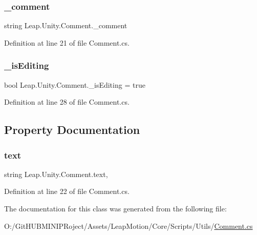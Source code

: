 \subsubsection{\texorpdfstring{\_comment}{\_comment}}
{\footnotesize\ttfamily string Leap.\+Unity.\+Comment.\+\_\+comment\hspace{0.3cm}{\ttfamily [protected]}}



Definition at line 21 of file Comment.\+cs.

\mbox{\label{class_leap_1_1_unity_1_1_comment_a0486c9e426260ebe04619952a89f1451}} 
\subsubsection{\texorpdfstring{\_isEditing}{\_isEditing}}
{\footnotesize\ttfamily bool Leap.\+Unity.\+Comment.\+\_\+is\+Editing = true\hspace{0.3cm}{\ttfamily [protected]}}



Definition at line 28 of file Comment.\+cs.



\subsection{Property Documentation}
\mbox{\label{class_leap_1_1_unity_1_1_comment_a21cc1f0a7d0ee692daae8bf5d4844654}} 
\subsubsection{\texorpdfstring{text}{text}}
{\footnotesize\ttfamily string Leap.\+Unity.\+Comment.\+text\hspace{0.3cm}{\ttfamily [get]}, {\ttfamily [set]}}



Definition at line 22 of file Comment.\+cs.



The documentation for this class was generated from the following file\+:\begin{DoxyCompactItemize}
\item 
O\+:/\+Git\+H\+U\+B\+M\+I\+N\+I\+P\+Roject/\+Assets/\+Leap\+Motion/\+Core/\+Scripts/\+Utils/\mbox{\hyperlink{_comment_8cs}{Comment.\+cs}}\end{DoxyCompactItemize}
